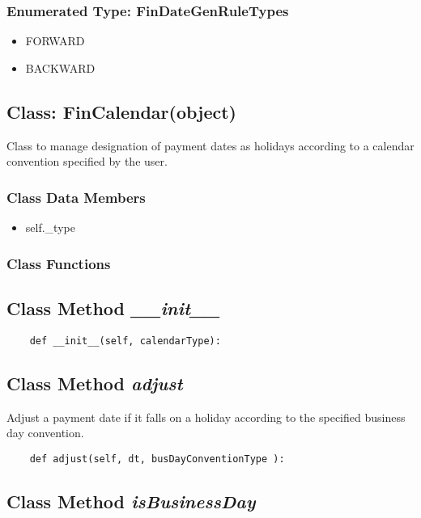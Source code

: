 \documentclass[twoside,11pt]{book}
\begin{document}
\subsubsection{Enumerated Type: FinDateGenRuleTypes}
\begin{itemize}
\item{FORWARD}
\item{BACKWARD}
\end{itemize}

\subsection{Class: FinCalendar(object)}
Class to manage designation of payment dates as holidays according to a calendar convention specified by the user. 

\subsubsection{Class Data Members}
\begin{itemize}
\item{self.\_type}
\end{itemize}

\subsubsection{Class Functions}

\subsection{Class Method {\it \_\_init\_\_}}


\begin{lstlisting}
    def __init__(self, calendarType):
\end{lstlisting}

\subsection{Class Method {\it adjust}}
Adjust a payment date if it falls on a holiday according to the specified business day convention. 

\begin{lstlisting}
    def adjust(self, dt, busDayConventionType ):
\end{lstlisting}

\subsection{Class Method {\it isBusinessDay}}
\end{document}
